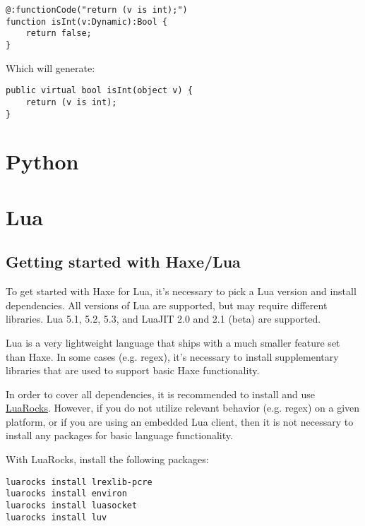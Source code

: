 \begin{lstlisting}
@:functionCode("return (v is int);")
function isInt(v:Dynamic):Bool {
    return false;
}
\end{lstlisting}

Which will generate:

\begin{lstlisting}
public virtual bool isInt(object v) {
    return (v is int);
}
\end{lstlisting}


\section{Python}
\label{target-python}



\section{Lua}
\label{target-lua}

\subsection{Getting started with Haxe/Lua}
\label{target-lua-getting-started}

To get started with Haxe for Lua, it's necessary to pick a Lua version and install
dependencies.  All versions of Lua are supported, but may require different
libraries.  Lua 5.1, 5.2, 5.3, and LuaJIT 2.0 and 2.1 (beta) are supported.

Lua is a very lightweight language that ships with a much smaller  feature set
than Haxe.  In some cases (e.g. regex), it's necessary to install supplementary
libraries that are used to support basic Haxe functionality.

In order to cover all dependencies, it is recommended to install and use
\href{https://github.com/luarocks/luarocks/wiki/Download}{LuaRocks}.  However,
if you do not utilize relevant behavior (e.g. regex) on a given platform,
or if you are using an embedded Lua client, then it is not necessary to
install any packages for basic language functionality.

With LuaRocks, install the following packages:

\begin{lstlisting}
luarocks install lrexlib-pcre
luarocks install environ
luarocks install luasocket
luarocks install luv
\end{lstlisting}


